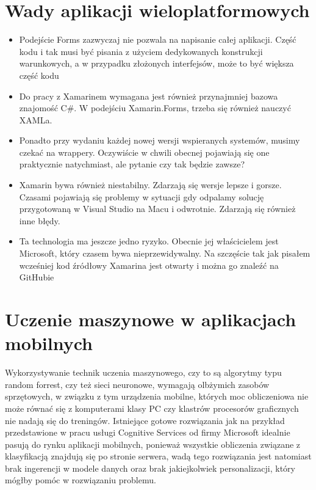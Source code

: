\documentclass[brudnopis]{xmgr}
\begin{document}
\section{Wady aplikacji wieloplatformowych}

\begin{itemize}
\item
Podejście Forms zazwyczaj nie pozwala na napisanie całej aplikacji. Część kodu i tak musi być pisania z użyciem dedykowanych konstrukcji warunkowych, a w przypadku złożonych interfejsów, może to być większa część kodu
\item
Do pracy z Xamarinem wymagana jest również przynajmniej bazowa znajomość C\#. W podejściu Xamarin.Forms, trzeba się również nauczyć XAMLa.
\item
Ponadto przy wydaniu każdej nowej wersji wspieranych systemów, musimy czekać na wrappery. Oczywiście w chwili obecnej pojawiają się one praktycznie natychmiast, ale pytanie czy tak będzie zawsze?
\item
Xamarin bywa również niestabilny. Zdarzają się wersje lepsze i gorsze. Czasami pojawiają się problemy w sytuacji gdy odpalamy solucję przygotowaną w Visual Studio na Macu i odwrotnie. Zdarzają się również inne błędy.
\item
Ta technologia ma jeszcze jedno ryzyko. Obecnie jej właścicielem jest Microsoft, który czasem bywa nieprzewidywalny. Na szczęście tak jak pisałem wcześniej kod źródłowy Xamarina jest otwarty i można go znaleźć na GitHubie

\end{itemize}

\section{Uczenie maszynowe w aplikacjach mobilnych}

Wykorzystywanie technik uczenia maszynowego, czy to są algorytmy typu random forrest, czy też sieci neuronowe, wymagają olbżymich zasobów sprzętowych, w związku z tym urządzenia mobilne, których moc obliczeniowa nie może równać się z komputerami klasy PC czy klastrów procesorów graficznych nie nadają się do treningów. Istniejące gotowe rozwiązania jak na przykład przedstawione w pracu usługi Cognitive Services od firmy Microsoft idealnie pasują do rynku aplikacji mobilnych, ponieważ wszystkie obliczenia związane z klasyfikacją znajdują się po stronie serwera, wadą tego rozwiązania jest natomiast brak ingerencji w modele danych oraz brak jakiejkolwiek personalizacji, który mógłby pomóc w rozwiązaniu problemu.
\end{document}
